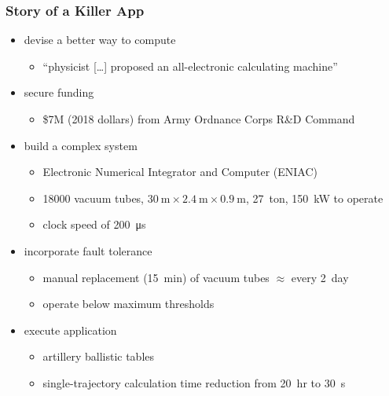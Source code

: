 \documentclass[handout]{beamer}
\begin{document}
\begin{frame}
  \frametitle{Story of a Killer App}
  \begin{itemize}[<+->]
  \item devise a better way to compute 
    \begin{itemize}[<6->]
    \item ``physicist [\ldots] proposed an all-electronic calculating machine''
    \end{itemize}
  \item secure funding 
    \begin{itemize}[<6->]
    \item \$7M (2018 dollars) from Army Ordnance Corps R\&D Command
    \end{itemize}
  \item build a complex system 
    \begin{itemize}[<6->]
    \item Electronic Numerical Integrator and Computer (ENIAC)
    \item \num{18000} vacuum tubes, $\SI{30}{\meter} \times \SI{2.4}{\meter} \times \SI{0.9}{\meter}$, \SI{27}{ton}, \SI{150}{\kilo\watt} to operate
    \item clock speed of \SI{200}{\micro\second}
    \end{itemize}
  \item incorporate fault tolerance 
    \begin{itemize}[<6->]
    \item manual replacement (\SI{15}{min}) of vacuum tubes $\approx$ every \SI{2}{day}
    \item operate below maximum thresholds
    \end{itemize}
  \item execute application 
    \begin{itemize}[<6->]
    \item artillery ballistic tables
    \item single-trajectory calculation time reduction from \SI{20}{hr} to \SI{30}{\second}
    \end{itemize}
  \end{itemize}
\end{frame}
\end{document}

